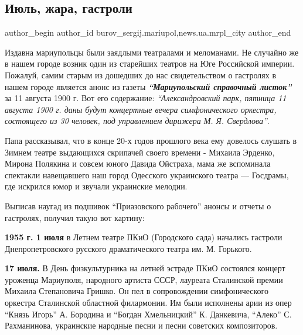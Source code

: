  
 
 
 
 
 
\subsection{Июль, жара, гастроли}
\label{sec:30_06_2018.stz.news.ua.mrpl_city.1.ijul_zhara_gastroli}
 
\ifcmt
 author_begin
   author_id burov_sergij.mariupol,news.ua.mrpl_city
 author_end
\fi

Издавна мариупольцы были заядлыми театралами и меломанами. Не случайно же в
нашем городе возник один из старейших театров на Юге Российской империи.
Пожалуй, самим старым из дошедших до нас свидетельством о гастролях в нашем
городе является анонс из газеты \textbf{\em\enquote{Мариупольский справочный листок}} за 11 августа
1900 г. Вот его содержание: \emph{\enquote{Александровский парк, пятница 11 августа 1900 г.
даны будут концертные вечера симфонического оркестра, состоящего из 30 человек,
под управлением дирижера М. Я. Свердлова}}.

Папа рассказывал, что в конце 20-х годов прошлого века ему довелось слушать в
Зимнем театре выдающихся скрипачей своего времени - Михаила Эрденко, Мирона
Полякина и совсем юного Давида Ойстраха, мама же вспоминала спектакли
навещавшего наш город Одесского украинского театра — Госдрамы, где искрился
юмор и звучали украинские мелодии.

Выписав наугад из подшивок \enquote{Приазовского рабочего} анонсы и отчеты о гастролях,
получил такую вот картину:

\textbf{1955 г. 1 июля} в Летнем театре ПКиО (Городского сада) начались гастроли
Днепропетровского русского драматического театра им. М. Горького.

\textbf{17 июля.} В День физкультурника на летней эстраде ПКиО состоялся концерт
уроженца Мариуполя, народного артиста СССР, лауреата Сталинской премии Михаила
Степановича Гришко. Он пел в сопровождении симфонического оркестра Сталинской
областной филармонии. Им были исполнены арии из опер \enquote{Князь Игорь} А. Бородина
и \enquote{Богдан Хмельницкий} К. Данкевича, \enquote{Алеко} С. Рахманинова, украинские
народные песни и песни советских композиторов.


